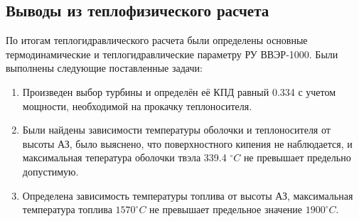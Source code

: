 \subsection{Выводы из теплофизического расчета}
По итогам теплогидравлического расчета были определены основные термодинамические и теплогидравлические параметру РУ ВВЭР-1000. Были выполнены следующие поставленные задачи:
\begin{enumerate}
   \item Произведен выбор турбины и определён её КПД равный 0.334 с учетом мощности, необходимой на прокачку теплоносителя.
   \item Были найдены зависимости температуры оболочки и теплоносителя от высоты АЗ, было выяснено, что поверхностного кипения не наблюдается, и максимальная тепература оболочки твэла 339.4 $^\circ C$ не превышает предельно допустимую.
   \item Определена зависимость температуры топлива от высоты АЗ, максимальная температура топлива $1570 ^\circ C$ не превышает предельное значение $1900 ^\circ C$.
\end{enumerate}

